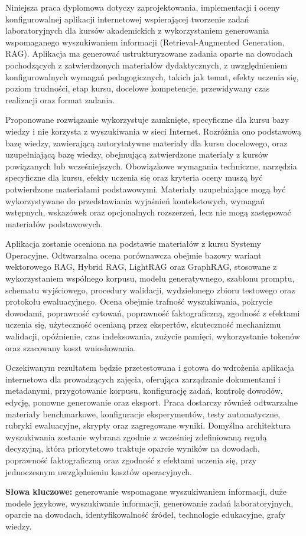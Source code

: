 \documentclass[12pt,a4paper]{report}
\numberwithin{equation}{chapter}
\newenvironment{abstract_polish}
{%
    \clearpage
    \begin{otherlanguage}{polish}
    \section*{Streszczenie}
    \noindent
}
{%
    \par
    \end{otherlanguage}
    \clearpage
}
\begin{document}
\clearpage
\begin{abstract_polish}
Niniejsza praca dyplomowa dotyczy zaprojektowania, implementacji i oceny
konfigurowalnej aplikacji internetowej wspierającej tworzenie zadań laboratoryjnych
dla kursów akademickich z wykorzystaniem generowania wspomaganego wyszukiwaniem
informacji (Retrieval-Augmented Generation, RAG). Aplikacja ma generować
ustrukturyzowane zadania oparte na dowodach pochodzących z zatwierdzonych
materiałów dydaktycznych, z uwzględnieniem konfigurowalnych wymagań
pedagogicznych, takich jak temat, efekty uczenia się, poziom trudności, etap
kursu, docelowe kompetencje, przewidywany czas realizacji oraz format zadania.

Proponowane rozwiązanie wykorzystuje zamknięte, specyficzne dla kursu bazy
wiedzy i nie korzysta z wyszukiwania w sieci Internet. Rozróżnia ono podstawową
bazę wiedzy, zawierającą autorytatywne materiały dla kursu docelowego, oraz
uzupełniającą bazę wiedzy, obejmującą zatwierdzone materiały z kursów
powiązanych lub wcześniejszych. Obowiązkowe wymagania techniczne, narzędzia
specyficzne dla kursu, efekty uczenia się oraz kryteria oceny muszą być
potwierdzone materiałami podstawowymi. Materiały uzupełniające mogą być
wykorzystywane do przedstawiania wyjaśnień kontekstowych, wymagań wstępnych,
wskazówek oraz opcjonalnych rozszerzeń, lecz nie mogą zastępować materiałów
podstawowych.

Aplikacja zostanie oceniona na podstawie materiałów z kursu Systemy Operacyjne.
Odtwarzalna ocena porównawcza obejmie bazowy wariant wektorowego RAG, Hybrid
RAG, LightRAG oraz GraphRAG, stosowane z wykorzystaniem wspólnego korpusu,
modelu generatywnego, szablonu promptu, schematu wyjściowego, procedury
walidacji, wydzielonego zbioru testowego oraz protokołu ewaluacyjnego. Ocena
obejmie trafność wyszukiwania, pokrycie dowodami, poprawność cytowań,
poprawność faktograficzną, zgodność z efektami uczenia się, użyteczność ocenianą
przez ekspertów, skuteczność mechanizmu walidacji, opóźnienie, czas indeksowania,
zużycie pamięci, wykorzystanie tokenów oraz szacowany koszt wnioskowania.

Oczekiwanym rezultatem będzie przetestowana i gotowa do wdrożenia aplikacja
internetowa dla prowadzących zajęcia, oferująca zarządzanie dokumentami i
metadanymi, przygotowanie korpusu, konfigurację zadań, kontrolę dowodów,
edycję, ponowne generowanie oraz eksport. Praca dostarczy również odtwarzalne
materiały benchmarkowe, konfiguracje eksperymentów, testy automatyczne, rubryki
ewaluacyjne, skrypty oraz zagregowane wyniki. Domyślna architektura wyszukiwania
zostanie wybrana zgodnie z wcześniej zdefiniowaną regułą decyzyjną, która
priorytetowo traktuje oparcie wyników na dowodach, poprawność faktograficzną
oraz zgodność z efektami uczenia się, przy jednoczesnym uwzględnieniu kosztów
operacyjnych.

\textbf{Słowa kluczowe:} generowanie wspomagane wyszukiwaniem informacji,
duże modele językowe, wyszukiwanie informacji, generowanie zadań
laboratoryjnych, oparcie na dowodach, identyfikowalność źródeł, technologie
edukacyjne, grafy wiedzy.
\end{abstract_polish}
\end{document}
